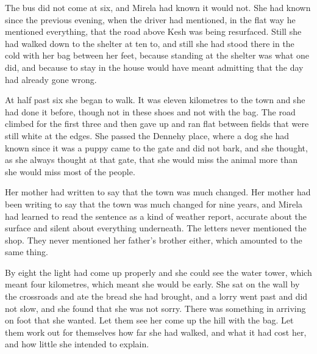 \ibpagebreak
{}

\begin{ibtextbody}
  The bus did not come at six, and Mirela had known it would not. She had known
  since the previous evening, when the driver had mentioned, in the flat way he
  mentioned everything, that the road above Kesh was being resurfaced. Still she
  had walked down to the shelter at ten to, and still she had stood there in the
  cold with her bag between her feet, because standing at the shelter was what
  one did, and because to stay in the house would have meant admitting that the
  day had already gone wrong.

  At half past six she began to walk. It was eleven kilometres to the town and
  she had done it before, though not in these shoes and not with the bag. The
  road climbed for the first three and then gave up and ran flat between fields
  that were still white at the edges. She passed the Dennehy place, where a dog
  she had known since it was a puppy came to the gate and did not bark, and she
  thought, as she always thought at that gate, that she would miss the animal
  more than she would miss most of the people.

  Her mother had written to say that the town was much changed. Her mother had
  been writing to say that the town was much changed for nine years, and Mirela
  had learned to read the sentence as a kind of weather report, accurate about
  the surface and silent about everything underneath. The letters never
  mentioned the shop. They never mentioned her father's brother either, which
  amounted to the same thing.

  By eight the light had come up properly and she could see the water tower,
  which meant four kilometres, which meant she would be early. She sat on the
  wall by the crossroads and ate the bread she had brought, and a lorry went past
  and did not slow, and she found that she was not sorry. There was something in
  arriving on foot that she wanted. Let them see her come up the hill with the
  bag. Let them work out for themselves how far she had walked, and what it had
  cost her, and how little she intended to explain.
\end{ibtextbody}

\ibpagebreak
\ibdisclaimer
{}


